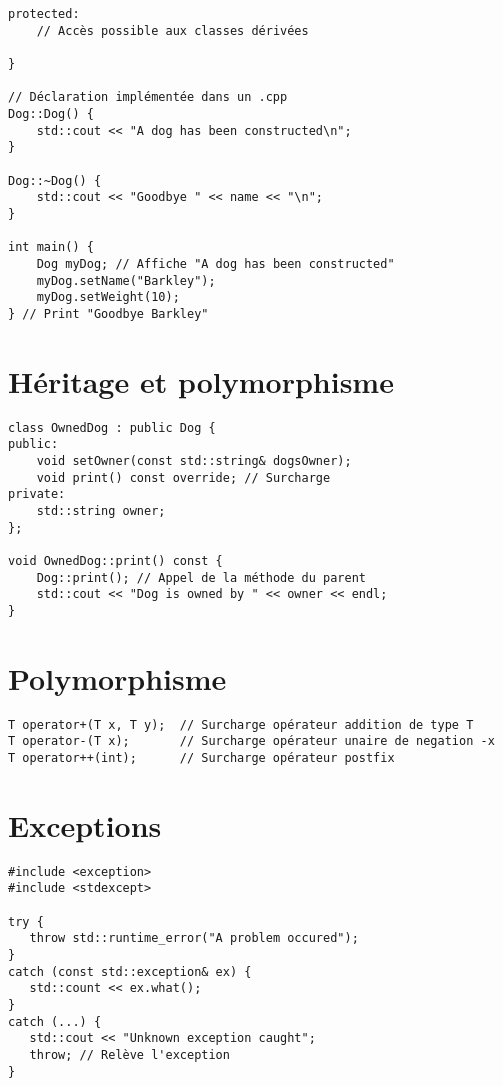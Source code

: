 \documentclass{article}
\begin{document}
\begin{multicols*}{3}
\begin{lstlisting}
protected:
    // Accès possible aux classes dérivées

}

// Déclaration implémentée dans un .cpp
Dog::Dog() {
    std::cout << "A dog has been constructed\n";
}

Dog::~Dog() {
    std::cout << "Goodbye " << name << "\n";
}

int main() {
    Dog myDog; // Affiche "A dog has been constructed"
    myDog.setName("Barkley");
    myDog.setWeight(10);
} // Print "Goodbye Barkley"
\end{lstlisting}

\section*{Héritage et polymorphisme}

\begin{lstlisting}
class OwnedDog : public Dog {
public:
    void setOwner(const std::string& dogsOwner);
    void print() const override; // Surcharge
private:
    std::string owner;
};

void OwnedDog::print() const {
    Dog::print(); // Appel de la méthode du parent
    std::cout << "Dog is owned by " << owner << endl;
}
\end{lstlisting}

\section*{Polymorphisme}

\begin{lstlisting}
T operator+(T x, T y);  // Surcharge opérateur addition de type T
T operator-(T x);       // Surcharge opérateur unaire de negation -x
T operator++(int);      // Surcharge opérateur postfix

\end{lstlisting}

\section*{Exceptions}

\begin{lstlisting}
#include <exception>
#include <stdexcept>

try {
   throw std::runtime_error("A problem occured");
}
catch (const std::exception& ex) {
   std::count << ex.what();
}
catch (...) {
   std::cout << "Unknown exception caught";
   throw; // Relève l'exception
}
\end{lstlisting}


\end{multicols*}
\end{document}
